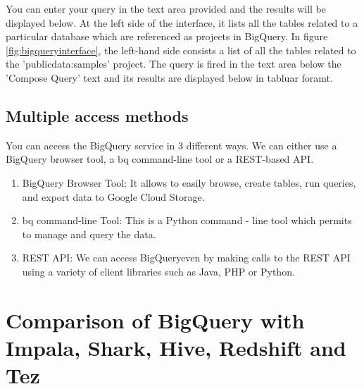 \documentclass[9pt,twocolumn,twoside]{../../styles/osajnl}
\begin{document}
\noindent
You can enter your query in the text area provided and the results
will be displayed below. At the left side of the interface, it lists
all the tables related to a particular database which are referenced
as projects in BigQuery. In figure \ref{fig:bigqueryinterface}, the
left-hand side consists a list of all the tables related to the
'publicdata:samples' project. The query is fired in the text area
below the 'Compose Query' text and its results are displayed below in
tabluar foramt.

\subsection{Multiple access methods}
You can access the BigQuery service in 3 different ways. We can either
use a BigQuery browser tool, a bq command-line tool or a REST-based
API. \begin{enumerate}
\item BigQuery Browser Tool: It allows to easily browse, create
  tables, run queries, and export data to Google Cloud Storage.
\item bq command-line Tool: This is a Python command - line tool which
  permits to manage and query the data. \item REST API: We can access
  BigQueryeven by making calls to the REST API using a variety of
  client libraries such as Java, PHP or Python.  \end{enumerate}

\section{Comparison of BigQuery with Impala, Shark, Hive, Redshift and Tez}
\end{document}
